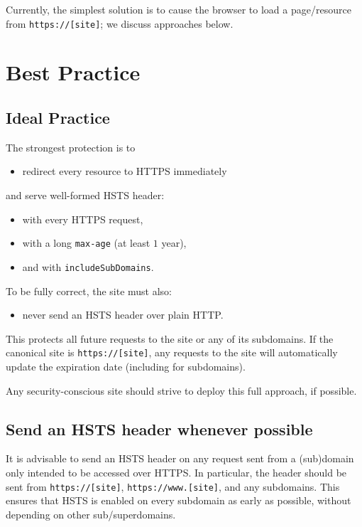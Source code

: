 \documentclass[conference]{./IEEEtran}
\newcommand{\site}[1]{\texttt{#1}}
\newcommand{\code}[1]{\texttt{#1}}
\newcommand{\iSD}{{\code{includeSubDomains}}}
\newcommand{\genericsite}{[site]}
\newcommand{\s}{{\site{https://\genericsite}}}
\newcommand{\sw}{{\site{https://www.\genericsite}}}
\theoremstyle{plain}
\begin{document}
Currently, the simplest solution is to cause the browser to load a page/resource from \s; we discuss approaches below.


\section{Best Practice}


\subsection{Ideal Practice}


The strongest protection is to

\begin{itemize}
\item redirect every resource to HTTPS immediately
\end{itemize}

and serve well-formed  HSTS header:

\begin{itemize}
\item with every HTTPS request,
\item with a long \code{max-age} (at least $1$ year),
\item and with \iSD.
\end{itemize}

To be fully correct, the site must also:

\begin{itemize}
\item never send an HSTS header over plain HTTP.
\end{itemize}

This protects all future requests to the site or any of its subdomains. If the canonical site is \s, any requests to the site will automatically update the expiration date (including for subdomains).

Any security-conscious site should strive to deploy this full approach, if possible.

\subsection{Send an HSTS header whenever possible}

It is advisable to send an HSTS header on any request sent from a (sub)domain only intended to be accessed over HTTPS. In particular, the header should be sent from \s, \sw, and any subdomains. This ensures that HSTS is enabled on every subdomain as early as possible, without depending on other sub/superdomains.
\end{document}
